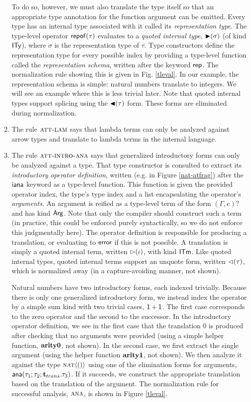 \begin{enumerate}
To do so, however, we must also translate the type itself so that an appropriate type annotation for the function argument can be emitted. Every type has an internal type associated with it called its \emph{representation type}. The type-level operator ${\sf repof}(\tau)$ evaluates to a \emph{quoted internal type}, ${\blacktriangleright}(\sigma)$ (of kind $\textsf{ITy}$), where $\sigma$ is the representation type of $\tau$. Type constructors define the representation type for every possible index by providing a type-level function called the \emph{representation schema}, written after the keyword ${\sf rep}$. The normalization rule showing this is given in Fig. \ref{tleval}. In our example, the representation schema is simple: natural numbers translate to integers. We will see an example where this is less trivial later. Note that quoted internal types support splicing using the ${\blacktriangleleft}(\tau)$ form. These forms are eliminated during normalization.
\item The rule $\textsc{att-lam}$ says that lambda terms can only be analyzed against arrow types and translate to lambda terms in the internal language.
\item The rule $\textsc{att-intro-ana}$ says that generalized introductory forms can only be analyzed against a type. That type constructor is consulted to extract its \emph{introductory operator definition}, written (e.g. in Figure \ref{nat-atfrag}) after the ${\sf iana}$ keyword as a type-level function. This function is given the provided operator index, the type's type index and a list encapsulating the operator's  \emph{arguments}. An argument is reified as a type-level term of the form $(\Gamma, e)?$ and has kind ${\sf Arg}$. Note that only the compiler should construct such a term (in practice, this could be enforced purely syntactically, so we do not enforce this judgmentally here). The operator definition is responsible for producing a translation, or evaluating to ${\sf error}$ if this is not possible. A translation is simply a quoted internal term, written $\rhd(\iota)$, with kind $\textsf{ITm}$. Like quoted internal types, quoted internal terms support an unquote form, written ${\lhd}(\tau)$, which is normalized away (in a capture-avoiding manner, not shown).

Natural numbers have two introductory forms, each indexed trivially. Because there is only one generalized introductory form, we instead index the operator by a simple sum kind with two trivial cases, $\textsf{1} + \textsf{1}$. The first case corresponds to the zero operator and the second to the successor. In the introductory operator definition, we see in the first case that the translation $0$ is produced after checking that no arguments were provided (using a simple helper function, ${\textbf{arity0}}$, not shown). In the second case, we first extract the single argument (using the helper function ${\textbf{arity1}}$, not shown). We then analyze it against the type $\textsc{nat}\langle()\rangle$ using one of the elimination forms for arguments, ${\sf ana}(\tau_1; \tau_2; {\textbf{t}}_{trans}.\tau_3)$. If it succeeds, we construct the appropriate translation based on the translation of the argument. The normalization rule for successful analysis, $\textsc{ana}$, is shown in Figure \ref{tleval}. 


\end{enumerate}

